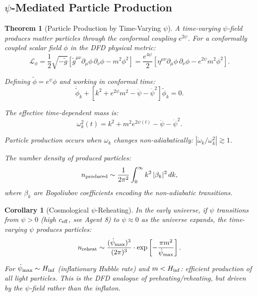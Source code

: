 \documentclass[11pt,a4paper]{article}
\newtheorem{theorem}{Theorem}
\newtheorem{corollary}{Corollary}
\begin{document}
\subsection{$\psi$-Mediated Particle Production}

\begin{theorem}[Particle Production by Time-Varying $\psi$]
\label{thm:particle-production}
A time-varying $\psi$-field produces matter particles through the conformal coupling $e^{2\psi}$. For a conformally coupled scalar field $\phi$ in the DFD physical metric:
\begin{equation}
\mathcal{L}_\phi = \frac{1}{2}\sqrt{-\tilde{g}}\left[\tilde{g}^{\mu\nu}\partial_\mu\phi\,\partial_\nu\phi - m^2\phi^2\right] = \frac{e^{4\psi}}{2}\left[\eta^{\mu\nu}\partial_\mu\phi\,\partial_\nu\phi - e^{2\psi}m^2\phi^2\right].
\end{equation}

Defining $\tilde\phi = e^\psi\phi$ and working in conformal time:
\begin{equation}
\ddot{\tilde\phi}_k + \left[k^2 + e^{2\psi}m^2 - \ddot\psi - \dot\psi^2\right]\tilde\phi_k = 0.
\end{equation}

The effective time-dependent mass is:
\begin{equation}
\omega_k^2(t) = k^2 + m^2 e^{2\psi(t)} - \ddot\psi - \dot\psi^2.
\end{equation}

Particle production occurs when $\omega_k$ changes non-adiabatically: $|\dot\omega_k/\omega_k^2| \gtrsim 1$.

The number density of produced particles:
\begin{equation}
n_{\rm produced} \sim \frac{1}{2\pi^2}\int_0^\infty k^2\,|\beta_k|^2\,dk,
\end{equation}
where $\beta_k$ are Bogoliubov coefficients encoding the non-adiabatic transitions.
\end{theorem}

\begin{corollary}[Cosmological $\psi$-Reheating]
In the early universe, if $\psi$ transitions from $\psi > 0$ (high $c_{\rm eff}$, see Agent 8) to $\psi \approx 0$ as the universe expands, the time-varying $\psi$ produces particles:
\begin{equation}
n_{\rm reheat} \sim \frac{(\dot\psi_{\rm max})^3}{(2\pi)^3}\cdot\exp\left[-\frac{\pi m^2}{\dot\psi_{\rm max}}\right].
\end{equation}

For $\dot\psi_{\rm max} \sim H_{\rm inf}$ (inflationary Hubble rate) and $m < H_{\rm inf}$: efficient production of all light particles. This is the DFD analogue of preheating/reheating, but driven by the $\psi$-field rather than the inflaton.
\end{corollary}
\end{document}
